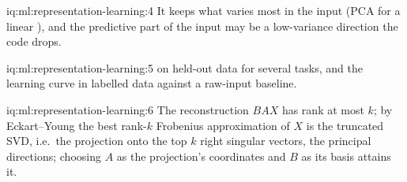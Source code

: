 \begin{solution}{iq:ml:representation-learning:4}
It keeps what varies most in the input (PCA for a linear ), and the predictive part of the input may be a
low-variance direction the code drops.
\end{solution}

\begin{solution}{iq:ml:representation-learning:5}
 on held-out data for several tasks, and the learning curve in labelled data against a raw-input baseline.
\end{solution}

\begin{solution}{iq:ml:representation-learning:6}
The reconstruction $BAX$ has rank at most $k$; by Eckart--Young the best rank-$k$ Frobenius approximation of $X$ is the
truncated SVD, i.e.\ the projection onto the top $k$ right singular vectors, the principal directions; choosing $A$ as the
projection's coordinates and $B$ as its basis attains it.
\end{solution}
